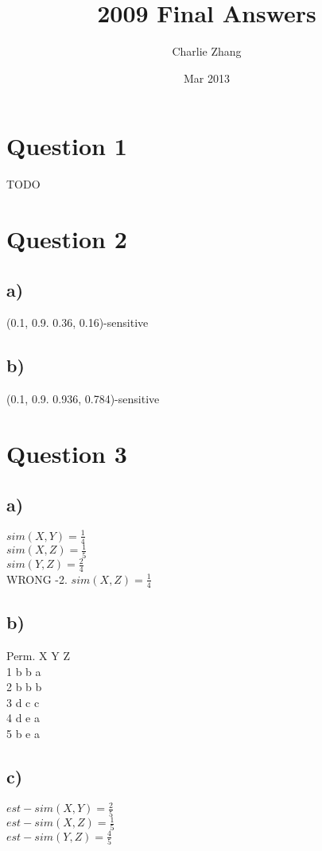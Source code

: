 \documentclass{article}
\title{2009 Final Answers}
\author{Charlie Zhang}
\date{Mar 2013}
\begin{document}
\maketitle
\section{Question 1}
TODO

\section{Question 2}
\subsection{a)}
(0.1, 0.9. 0.36, 0.16)-sensitive
\subsection{b)}
(0.1, 0.9. 0.936, 0.784)-sensitive

\section{Question 3}
\subsection{a)}
$sim(X,Y) = \frac{1}{4}$ \\
$sim(X,Z) = \frac{1}{5}$ \\
$sim(Y,Z) = \frac{2}{4}$ \\


WRONG -2. $sim(X,Z) = \frac{1}{4}$ \\

\subsection{b)}
Perm. X   Y    Z \\
1        b    b    a \\
2        b    b    b \\
3        d    c    c \\
4        d    e    a \\
5        b    e    a

\subsection{c)}
$est-sim(X,Y) = \frac{2}{5}$ \\
$est-sim(X,Z) = \frac{1}{5}$ \\
$est-sim(Y,Z) = \frac{4}{5}$ \\
\end{document}
